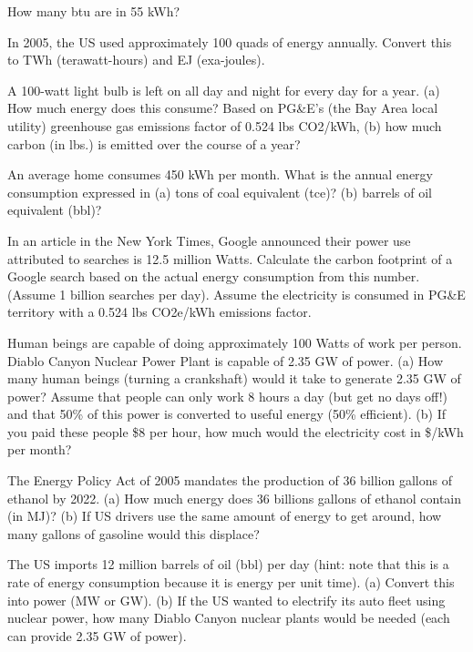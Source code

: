 \documentclass[12pt, oneside]{article}
\begin{document}
\problem{}
How many btu are in 55 kWh?

\problem{}
In 2005, the US used approximately 100 quads of energy annually.
Convert this to TWh (terawatt-hours) and EJ (exa-joules).

\problem{}
A 100-watt light bulb is left on all day and night for every day for
a year. (a) How much energy does this consume? Based on PG\&E’s (the Bay
Area local utility) greenhouse gas emissions factor of 0.524 lbs
CO2/kWh, (b) how much carbon (in lbs.) is emitted over the course of a
year?

\problem{}
An average home consumes 450 kWh per month. What is the annual
energy consumption expressed in (a) tons of coal equivalent (tce)? (b)
barrels of oil equivalent (bbl)?

\problem{}
In an article in the New York Times, Google announced their power
use attributed to searches is 12.5 million Watts. Calculate the carbon
footprint of a Google search based on the actual energy consumption from
this number. (Assume 1 billion searches per day). Assume the electricity
is consumed in PG\&E territory with a 0.524 lbs CO2e/kWh emissions
factor.

\problem{}
Human beings are capable of doing approximately 100 Watts of work
per person. Diablo Canyon Nuclear Power Plant is capable of 2.35 GW of
power. (a) How many human beings (turning a crankshaft) would it take to
generate 2.35 GW of power? Assume that people can only work 8 hours a
day (but get no days off!) and that 50\% of this power is converted to
useful energy (50\% efficient). (b) If you paid these people \$8 per hour,
how much would the electricity cost in \$/kWh per month?

\problem{}
The Energy Policy Act of 2005 mandates the production of 36 billion
gallons of ethanol by 2022. (a) How much energy does 36 billions gallons
of ethanol contain (in MJ)? (b) If US drivers use the same amount of
energy to get around, how many gallons of gasoline would this displace?

\problem{}
The US imports 12 million barrels of oil (bbl) per day (hint: note
that this is a rate of energy consumption because it is energy per unit
time). (a) Convert this into power (MW or GW). (b) If the US wanted to
electrify its auto fleet using nuclear power, how many Diablo Canyon
nuclear plants would be needed (each can provide 2.35 GW of power).
\end{document}
